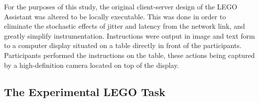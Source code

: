 \documentclass[10pt,letterpaper]{article}
\providecommand{\DIFaddtex}[1]{#1} %
\providecommand{\DIFdeltex}[1]{} %
\providecommand{\DIFaddbegin}{\protect\color{blue}} %
\providecommand{\DIFaddend}{\protect\color{black}} %
\providecommand{\DIFdelbegin}{\protect\color{red}} %
\providecommand{\DIFdelend}{\protect\color{black}} %
\providecommand{\DIFadd}[1]{\texorpdfstring{\DIFaddtex{#1}}{#1}} %
\providecommand{\DIFdel}[1]{\texorpdfstring{\DIFdeltex{#1}}{}} %
\newcommand{\DIFscaledelfig}{0.5}
\newlength{\DIFdelgraphicswidth} %
\newlength{\DIFdelgraphicsheight} %
\newcommand{\DIFaddincludegraphics}[2][]{{\color{blue}\fbox{\DIFOincludegraphics[#1]{#2}}}} %
\newcommand{\DIFdelincludegraphics}[2][]{%
\sbox{\DIFdelgraphicsbox}{\DIFOincludegraphics[#1]{#2}}%
\settoboxwidth{\DIFdelgraphicswidth}{\DIFdelgraphicsbox} %
\settoboxtotalheight{\DIFdelgraphicsheight}{\DIFdelgraphicsbox} %
\scalebox{\DIFscaledelfig}{%
\parbox[b]{\DIFdelgraphicswidth}{\usebox{\DIFdelgraphicsbox}\\[-\baselineskip] \rule{\DIFdelgraphicswidth}{0em}}\llap{\resizebox{\DIFdelgraphicswidth}{\DIFdelgraphicsheight}{%
\setlength{\unitlength}{\DIFdelgraphicswidth}%
\begin{picture}(1,1)%
\thicklines\linethickness{2pt} %
{\color[rgb]{1,0,0}\put(0,0){\framebox(1,1){}}}%
{\color[rgb]{1,0,0}\put(0,0){\line( 1,1){1}}}%
{\color[rgb]{1,0,0}\put(0,1){\line(1,-1){1}}}%
\end{picture}%
}\hspace*{3pt}}} %
} %
\DeclareRobustCommand{\DIFaddbegin}{\DIFOaddbegin \let\includegraphics\DIFaddincludegraphics} %
\DeclareRobustCommand{\DIFaddend}{\DIFOaddend \let\includegraphics\DIFOincludegraphics} %
\DeclareRobustCommand{\DIFdelbegin}{\DIFOdelbegin \let\includegraphics\DIFdelincludegraphics} %
\DeclareRobustCommand{\DIFdelend}{\DIFOaddend \let\includegraphics\DIFOincludegraphics} %
\begin{document}
\DIFdelbegin \DIFdel{The original design of the LEGO assistance application was based on a client-server model communicating over a wireless network, with the client software running on a wearable device and the server software deployed on a cloudlet. 
}\DIFdelend %
For the purposes of this study, \DIFdelbegin \DIFdel{this design }\DIFdelend \DIFaddbegin \DIFadd{the original client-server design of the LEGO Assistant }\DIFaddend was altered to be \DIFdelbegin \DIFdel{executable on a single, non-networked computer, }\DIFdelend \DIFaddbegin \DIFadd{locally executable.
This was done }\DIFaddend in order to eliminate the stochastic effects of jitter and latency \DIFdelbegin \DIFdel{on }\DIFdelend \DIFaddbegin \DIFadd{from }\DIFaddend the network link\DIFdelbegin \DIFdel{.
By this means, we achieve much more fine-grained control over the latencies to which the system is subject.
Additionally, this greatly simplified the instrumentationof the application.
}\DIFdelend \DIFaddbegin \DIFadd{, and greatly simplify instrumentation.
}\DIFaddend Instructions were output in image and text form to a computer display situated on a table directly in front of the participants.
Participants performed the instructions on the table, these actions being captured by a high-definition camera located on top of the display.

\DIFdelbegin \DIFdel{Finally, a data collection and experimental layer was implemented between the user interface and video capture and the core processing component of the LEGO Assistant.
This layer controlled the manipulated experimental variables and recorded the measured biometric and task-related effects.
}\DIFdelend %

\subsection{The Experimental LEGO Task}
\end{document}
